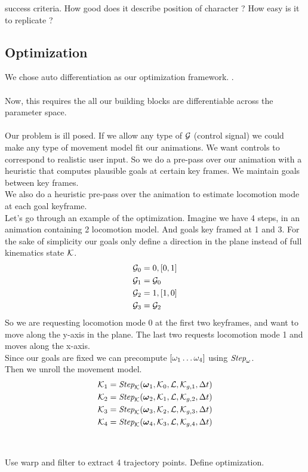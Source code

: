 success criteria. How good does it describe position of character ? How easy is it to replicate ?


\subsection{Optimization}
We chose auto differentiation as our optimization framework. . 
\\\\
Now, this requires the all our building blocks are differentiable across the parameter space.
\\\\ 
Our problem is ill posed. If we allow any type of $\mathcal{G}$ (control signal) we could make any type of movement model fit our animations. We want controls to correspond to realistic user input. So we do a pre-pass over our animation  with a heuristic that computes plausible goals at certain key frames. We maintain goals between key frames.
\\
We also do a heuristic pre-pass over the animation to estimate locomotion mode at each goal keyframe.
\\
Let's go through an example of the optimization. Imagine we have 4 steps, in an animation containing 2 locomotion model. And goals key framed at 1 and 3. For the sake of simplicity our goals only define a direction in the plane instead of full kinematics state $\mathcal{K}$.
\begin{subequations}
\begin{align}
    \mathcal{G}_0&={0,[0,1]}\\
    \mathcal{G}_1&=\mathcal{G}_0\\
    \mathcal{G}_2&={1,[1,0]}\\
    \mathcal{G}_3&=\mathcal{G}_2
\end{align}
\end{subequations}
So we are requesting locomotion mode 0 at the first two keyframes, and want to move along the y-axis in the plane. The last two requests locomotion mode 1 and moves along the x-axis.
\\
Since our goals are fixed we can precompute $[\omega_1 \ldots \omega_4]$ using $\textit{Step}_{\omega}$.
\\
Then we unroll the movement model.
\begin{subequations}
\begin{align}
    \mathcal{K}_1 &=\textit{Step}_{\mathcal{K}}(\boldsymbol{\omega }_1, \mathcal{K}_0, \mathcal{L}, \mathcal{K}_{g,1}, \Delta{t} )\\
    \mathcal{K}_2 &=\textit{Step}_{\mathcal{K}}(\boldsymbol{\omega }_2, \mathcal{K}_1, \mathcal{L}, \mathcal{K}_{g,2}, \Delta{t} )\\
    \mathcal{K}_3 &=\textit{Step}_{\mathcal{K}}(\boldsymbol{\omega }_3, \mathcal{K}_2, \mathcal{L}, \mathcal{K}_{g,3}, \Delta{t} )\\
    \mathcal{K}_4 &=\textit{Step}_{\mathcal{K}}(\boldsymbol{\omega }_4, \mathcal{K}_3, \mathcal{L}, \mathcal{K}_{g,4}, \Delta{t} )\\
\end{align}
\end{subequations}
\\\\
Use warp and filter to extract 4 trajectory points. Define optimization.


